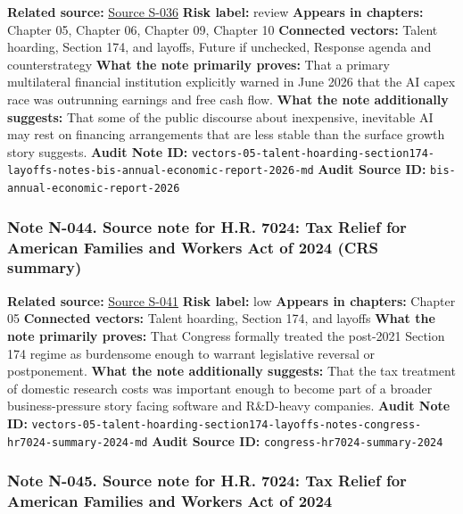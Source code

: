\documentclass[
  american,
  11pt,
  letterpaper,
]{article}
\begin{document}
\textbf{Related source:}
\hyperref[source-s-036-annual-economic-report-2026]{Source S-036}
\textbf{Risk label:} review \textbf{Appears in chapters:} Chapter 05,
Chapter 06, Chapter 09, Chapter 10 \textbf{Connected vectors:} Talent
hoarding, Section 174, and layoffs, Future if unchecked, Response agenda
and counterstrategy \textbf{What the note primarily proves:} That a
primary multilateral financial institution explicitly warned in June
2026 that the AI capex race was outrunning earnings and free cash flow.
\textbf{What the note additionally suggests:} That some of the public
discourse about inexpensive, inevitable AI may rest on financing
arrangements that are less stable than the surface growth story
suggests. \textbf{Audit Note ID:}
\texttt{vectors-05-talent-hoarding-section174-layoffs-notes-bis-annual-economic-report-2026-md}
\textbf{Audit Source ID:} \texttt{bis-annual-economic-report-2026}

\subsubsection{Note N-044. Source note for H.R. 7024: Tax Relief for
American Families and Workers Act of 2024 (CRS
summary)}\label{note-n-044-vectors-05-talent-hoarding-section174-layoffs-notes-congress-hr7024-summary-2024-md}

\textbf{Related source:}
\hyperref[source-s-041-h-r-7024-tax-relief-for-american-families-and-workers-act-of-2024-crs-summary]{Source
S-041} \textbf{Risk label:} low \textbf{Appears in chapters:} Chapter 05
\textbf{Connected vectors:} Talent hoarding, Section 174, and layoffs
\textbf{What the note primarily proves:} That Congress formally treated
the post-2021 Section 174 regime as burdensome enough to warrant
legislative reversal or postponement. \textbf{What the note additionally
suggests:} That the tax treatment of domestic research costs was
important enough to become part of a broader business-pressure story
facing software and R\&D-heavy companies. \textbf{Audit Note ID:}
\texttt{vectors-05-talent-hoarding-section174-layoffs-notes-congress-hr7024-summary-2024-md}
\textbf{Audit Source ID:} \texttt{congress-hr7024-summary-2024}

\subsubsection{Note N-045. Source note for H.R. 7024: Tax Relief for
American Families and Workers Act of
2024}\label{note-n-045-vectors-05-talent-hoarding-section174-layoffs-notes-congress-hr7024-tax-relief-2024-md}
\end{document}
